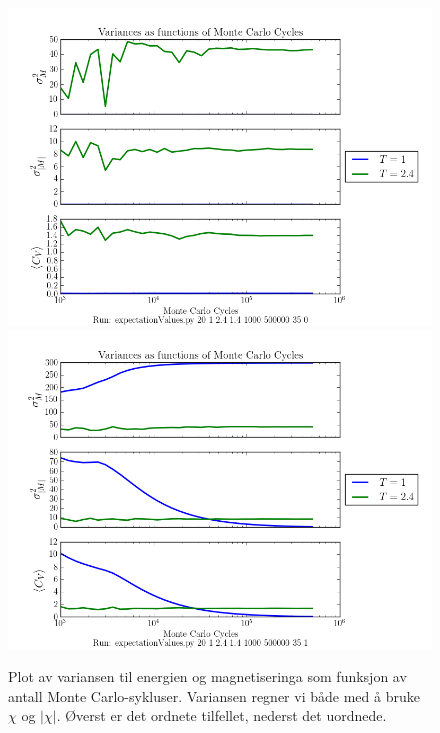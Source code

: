 \documentclass[11pt, twocolumn]{article}
\begin{document}
\begin{figure}[ht]
  \centering
  \includegraphics[scale=0.7]{../fig/variances.png}
  \includegraphics[scale=0.7]{../fig/variances_random.png}
  \caption{\label{fig:varianser} Plot av variansen til energien og magnetiseringa som
funksjon av antall Monte Carlo-sykluser. Variansen regner vi både med å bruke $\chi$ og $|\chi|$. Øverst
er det ordnete tilfellet, nederst det uordnede.}
\end{figure}
\end{document}

